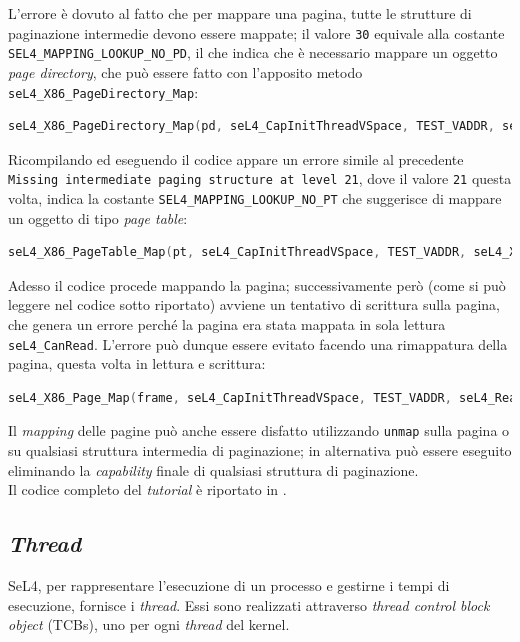 L'errore è dovuto al fatto che per mappare una pagina, tutte le strutture di paginazione intermedie devono essere mappate; il valore \texttt{30} equivale alla costante \texttt{SEL4\_MAPPING\_LOOKUP\_NO\_PD}, il che indica che è necessario mappare un oggetto \textit{page directory}, che può essere fatto con l'apposito metodo \texttt{seL4\_X86\_PageDirectory\_Map}:
\begin{lstlisting}[language=C++]
seL4_X86_PageDirectory_Map(pd, seL4_CapInitThreadVSpace, TEST_VADDR, seL4_X86_Default_VMAttributes);
\end{lstlisting}

Ricompilando ed eseguendo il codice appare un errore simile al precedente \texttt{Missing intermediate paging structure at level 21}, dove il valore \texttt{21} questa volta, indica la costante \texttt{SEL4\_MAPPING\_LOOKUP\_NO\_PT} che suggerisce di mappare un oggetto di tipo \textit{page table}:
\begin{lstlisting}[language=C++]
seL4_X86_PageTable_Map(pt, seL4_CapInitThreadVSpace, TEST_VADDR, seL4_X86_Default_VMAttributes);
\end{lstlisting}

Adesso il codice procede mappando la pagina; successivamente però (come si può leggere nel codice sotto riportato) avviene un tentativo di scrittura sulla pagina, che genera un errore perché la pagina era stata mappata in sola lettura \texttt{seL4\_CanRead}. L'errore può dunque essere evitato facendo una rimappatura della pagina, questa volta in lettura e scrittura:
\begin{lstlisting}[language=C++]
seL4_X86_Page_Map(frame, seL4_CapInitThreadVSpace, TEST_VADDR, seL4_ReadWrite, seL4_X86_Default_VMAttributes);
\end{lstlisting}

Il \textit{mapping} delle pagine può anche essere disfatto utilizzando \texttt{unmap} sulla pagina o su qualsiasi struttura intermedia di paginazione; in alternativa può essere eseguito eliminando la \textit{capability} finale di qualsiasi struttura di paginazione.\\
Il codice completo del \textit{tutorial} è riportato in \cite{mapping}.

\subsection{\textit{Thread}}
SeL4, per rappresentare l'esecuzione di un processo e gestirne i tempi di esecuzione, fornisce i \textit{thread}. Essi sono realizzati attraverso \textit{thread control block object} (TCBs), uno per ogni \textit{thread} del kernel.

